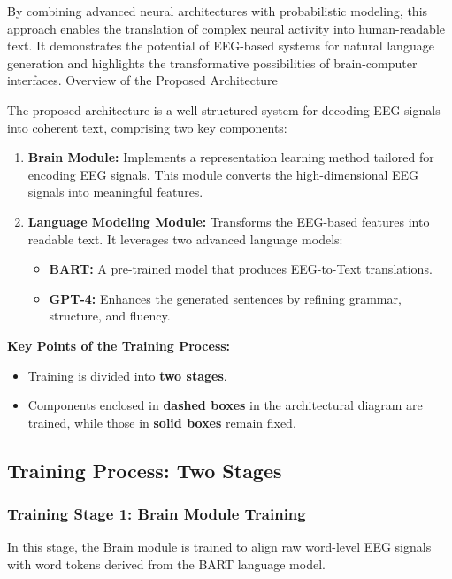 \documentclass[journal]{IEEEtran}
\begin{document}
By combining advanced neural architectures with probabilistic modeling, this approach enables the translation of complex neural activity into human-readable text. It demonstrates the potential of EEG-based systems for natural language generation and highlights the transformative possibilities of brain-computer interfaces. 
Overview of the Proposed Architecture

The proposed architecture is a well-structured system for decoding EEG signals into coherent text, comprising two key components:
\begin{enumerate}
	\item \textbf{Brain Module:} Implements a representation learning method tailored for encoding EEG signals. This module converts the high-dimensional EEG signals into meaningful features.
	\item \textbf{Language Modeling Module:} Transforms the EEG-based features into readable text. It leverages two advanced language models:
	      \begin{itemize}
	      	\item \textbf{BART:} A pre-trained model that produces EEG-to-Text translations.
	      	\item \textbf{GPT-4:} Enhances the generated sentences by refining grammar, structure, and fluency.
	      \end{itemize}
\end{enumerate}

\noindent \textbf{Key Points of the Training Process:}
\begin{itemize}
	\item Training is divided into \textbf{two stages}.
	\item Components enclosed in \textbf{dashed boxes} in the architectural diagram are trained, while those in \textbf{solid boxes} remain fixed.
\end{itemize}

\subsection{Training Process: Two Stages}

\subsubsection{Training Stage 1: Brain Module Training}
In this stage, the Brain module is trained to align raw word-level EEG signals with word tokens derived from the BART language model.
\end{document}
